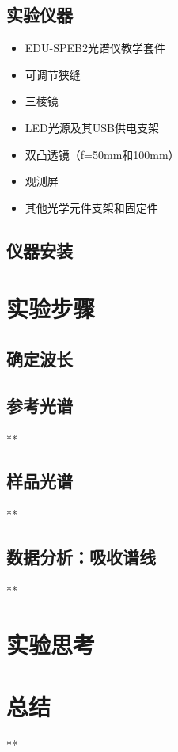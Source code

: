 \documentclass{ctexart}
\begin{document}
\subsection{实验仪器}
\begin{itemize}
    \item EDU-SPEB2光谱仪教学套件
    \item 可调节狭缝
    \item 三棱镜
    \item LED光源及其USB供电支架
    \item 双凸透镜（f=50mm和100mm）
    \item 观测屏
    \item 其他光学元件支架和固定件
\end{itemize}
\subsection{仪器安装}


\section{实验步骤}
\subsection{确定波长}

\subsection{参考光谱}
**

\subsection{样品光谱}
**

\subsection{数据分析：吸收谱线}
**

\section{实验思考}

\section{总结}
**
\end{document}
